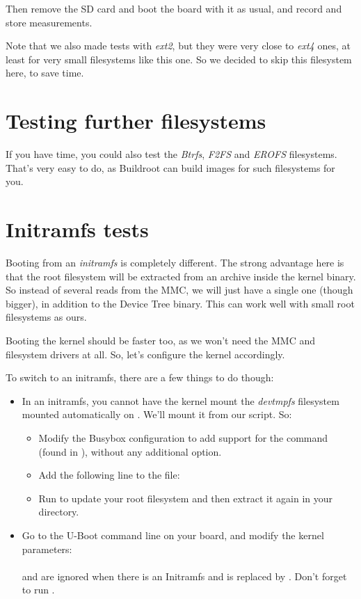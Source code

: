 Then remove the SD card and boot the board with it as usual, and record
and store measurements.

Note that we also made tests with {\em ext2}, but they were very close
to {\em ext4} ones, at least for very small filesystems like this one.
So we decided to skip this filesystem here, to save time.

\section{Testing further filesystems}

If you have time, you could also test the {\em Btrfs}, {\em F2FS} and
{\em EROFS} filesystems. That's very easy to do, as Buildroot can build
images for such filesystems for you.

\section{Initramfs tests}

Booting from an {\em initramfs} is completely different. The strong
advantage here is that the root filesystem will be extracted from an
archive inside the kernel binary. So instead of several reads from the
MMC, we will just have a single one (though bigger), in addition to the
Device Tree binary.  This can work well with small root filesystems as ours.

Booting the kernel should be faster too, as we won't need the MMC and
filesystem drivers at all. So, let's configure the kernel accordingly.

To switch to an initramfs, there are a few things to do though:
\begin{itemize}
\item In an initramfs, you cannot have the kernel mount the {\em
devtmpfs} filesystem mounted automatically on . We'll mount
it from our  script.
So:
   \begin{itemize}
   \item Modify the Busybox configuration to add support for the
    command (found in ), without
    any additional option.
   \item Add the following line to the  file:\\
   \item Run  to update your root filesystem and then
   extract it again in your  directory.
   \end{itemize}
\item Go to the U-Boot command line on your board, and modify the
kernel parameters:\\
   \\
    and  are ignored when there is an
   Initramfs and  is replaced by .
   Don't forget to run .
\end{itemize}

